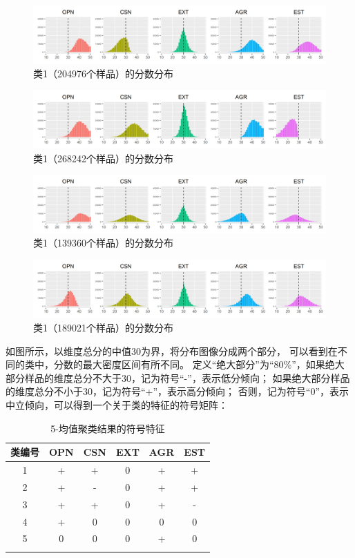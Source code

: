 \documentclass[UTF8]{ctexart}
\begin{document}
\begin{figure}[H]
  \centering
  \includegraphics[scale=0.478]{Cluster2.png}
  \caption{类1（204976个样品）的分数分布}
\end{figure}
\begin{figure}[H]
  \centering
  \includegraphics[scale=0.478]{Cluster3.png}
  \caption{类1（268242个样品）的分数分布}
\end{figure}
\begin{figure}[H]
  \centering
  \includegraphics[scale=0.478]{Cluster4.png}
  \caption{类1（139360个样品）的分数分布}
\end{figure}
\begin{figure}[H]
  \centering
  \includegraphics[scale=0.478]{Cluster5.png}
  \caption{类1（189021个样品）的分数分布}
\end{figure}
如图所示，以维度总分的中值30为界，将分布图像分成两个部分，
可以看到在不同的类中，分数的最大密度区间有所不同。
定义“绝大部分”为“80\%”，如果绝大部分样品的维度总分不大于30，记为符号“-”，表示低分倾向；
如果绝大部分样品的维度总分不小于30，记为符号“+”，表示高分倾向；
否则，记为符号“0”，表示中立倾向，可以得到一个关于类的特征的符号矩阵：
\begin{longtable}{c|c|c|c|c|c}
  \hline
  类编号 & OPN & CSN & EXT & AGR & EST \\\hline
  1   & +   & +   & 0   & +   & +   \\
  2   & +   & -   & 0   & +   & +   \\
  3   & +   & +   & 0   & +   & -   \\\hline
  4   & +   & 0   & 0   & 0   & 0   \\
  5   & 0   & 0   & 0   & +   & 0   \\\hline
  \caption{5-均值聚类结果的符号特征}
  \label{symbol5}
\end{longtable}
\end{document}
